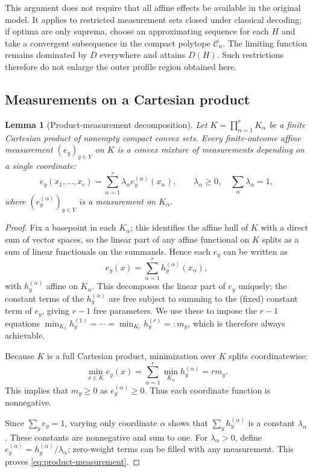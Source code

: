 \documentclass[a4paper,11pt,onecolumn,unpublished]{quantumarticle}
\newtheorem{lemma}[theorem]{Lemma}
\theoremstyle{definition}
\newcommand{\1}{\mathbf 1}
\newcommand{\Coeff}{\mathcal C}
\begin{document}
This argument does not require that all affine effects be available in the
original model. It applies to restricted measurement sets closed under
classical decoding; if optima are only suprema, choose an approximating sequence
for each $H$ and take a convergent subsequence in the compact polytope
$\Coeff_n$. The limiting function remains dominated by $D$ everywhere and
attains $D(H)$. Such restrictions therefore do not enlarge the outer profile
region obtained here.

\subsection{Measurements on a Cartesian product}

\begin{lemma}[Product-measurement decomposition]\label{lem:product-measurement}
	Let $K=\prod_{\alpha=1}^r K_\alpha$ be a finite Cartesian product of nonempty
	compact convex sets. Every finite-outcome affine measurement $(e_y)_{y\in Y}$
	on $K$ is a convex mixture of measurements depending on a single coordinate:
	\begin{equation}\label{eq:product-measurement}
		e_y(x_1,\ldots,x_r)=\sum_{\alpha=1}^r
		\lambda_\alpha e_y^{(\alpha)}(x_\alpha),
		\qquad \lambda_\alpha\ge0,\quad\sum_\alpha\lambda_\alpha=1,
	\end{equation}
	where $(e_y^{(\alpha)})_{y\in Y}$ is a measurement on $K_\alpha$. 
\end{lemma}

\begin{proof}
	Fix a basepoint in each $K_\alpha$; this identifies the affine hull of $K$
	with a direct sum of vector spaces, so the linear part of any affine
	functional on $K$ splits as a sum of linear functionals on the summands.
	Hence each $e_y$ can be written as
	\[
	e_y(x)=\sum_{\alpha=1}^r h_y^{(\alpha)}(x_\alpha),
	\]
	with $h_y^{(\alpha)}$ affine on $K_\alpha$. This decomposes the linear part
	of $e_y$ uniquely; the constant terms of the $h_y^{(\alpha)}$ are free
	subject to summing to the (fixed) constant term of $e_y$, giving $r-1$
	free parameters. We use these to impose the $r-1$ equations
	$\min_{K_1}h_y^{(1)}=\cdots=\min_{K_r}h_y^{(r)}=:m_y$, which is therefore
	always achievable.
	
	Because $K$ is a full Cartesian product, minimization over $K$ splits coordinatewise:
	\[
	\min_{x\in K}e_y(x)=\sum_{\alpha=1}^r\min_{K_\alpha}h_y^{(\alpha)}=rm_y.
	\]
	This implies that $m_y\ge0$ as $e_y^{(\alpha)}\geq 0$.
	Thus each coordinate function is
	nonnegative.
	
	Since $\sum_ye_y=1$, varying only coordinate $\alpha$ shows that
	$\sum_yh_y^{(\alpha)}$ is a constant $\lambda_\alpha$. These constants are
	nonnegative and sum to one. For $\lambda_\alpha>0$, define
	$e_y^{(\alpha)}=h_y^{(\alpha)}/\lambda_\alpha$; zero-weight terms can be filled with any measurement. This proves \eqref{eq:product-measurement}.
	
\end{proof}
\end{document}
